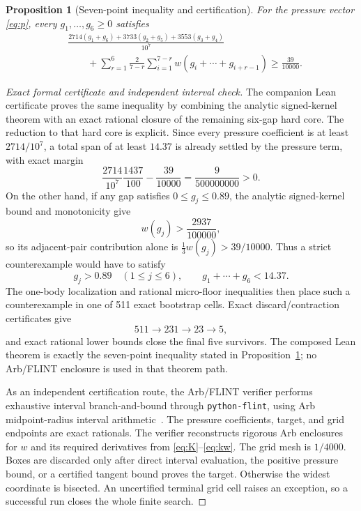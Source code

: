 \documentclass[11pt]{article}
\newtheorem{proposition}[theorem]{Proposition}
\begin{document}
\begin{proposition}[Seven-point inequality and certification]\label{prop:cert}
For the pressure vector \eqref{eq:p}, every $g_1,\ldots,g_6\ge0$ satisfies
\begin{align}
 &\frac{2714(g_1+g_6)+3733(g_2+g_5)+3553(g_3+g_4)}{10^7}\nonumber\\
 &\qquad+
 \sum_{r=1}^6\frac{2}{7-r}
 \sum_{i=1}^{7-r}w(g_i+\cdots+g_{i+r-1})
 \ge\frac{39}{10000}.
 \label{eq:cert}
\end{align}
\end{proposition}

\begin{proof}[Exact formal certificate and independent interval check]
The companion Lean certificate proves the same inequality by combining the
analytic signed-kernel theorem with an exact rational closure of the remaining
six-gap hard core.  The reduction to that hard core is explicit.  Since every
pressure coefficient is at least $2714/10^7$, a total span of at least
$14.37$ is already settled by the pressure term, with exact margin
\[
 \frac{2714}{10^7}\frac{1437}{100}
 -\frac{39}{10000}
 =
 \frac{9}{500000000}>0.
\]
On the other hand, if any gap satisfies $0\le g_j\le0.89$, the analytic
signed-kernel bound and monotonicity give
\[
 w(g_j)>\frac{2937}{100000},
\]
so its adjacent-pair contribution alone is
$\frac13w(g_j)>39/10000$.  Thus a strict counterexample would have to satisfy
\[
 g_j>0.89\quad(1\le j\le6),
 \qquad
 g_1+\cdots+g_6<14.37.
\]
The one-body localization and rational micro-floor inequalities then place
such a counterexample in one of 511 exact bootstrap cells.  Exact
discard/contraction certificates give
\[
 511\longrightarrow231\longrightarrow23\longrightarrow5,
\]
and exact rational lower bounds close the final five survivors.  The composed
Lean theorem is exactly the seven-point inequality stated in
Proposition~\ref{prop:cert}; no Arb/FLINT enclosure is used in that theorem
path.

As an independent certification route, the Arb/FLINT verifier performs
exhaustive interval branch-and-bound through \texttt{python-flint}, using
Arb midpoint-radius interval arithmetic~\cite{Johansson17}.  The
pressure coefficients, target, and grid endpoints are exact rationals.  The
verifier reconstructs rigorous Arb enclosures for $w$ and its required
derivatives from \eqref{eq:K}--\eqref{eq:kw}.  The grid mesh is $1/4000$.
Boxes are discarded only after direct interval evaluation, the positive
pressure bound, or a certified tangent bound proves the target.  Otherwise the
widest coordinate is bisected.  An uncertified terminal grid cell raises an
exception, so a successful run closes the whole finite search.


\end{proof}
\end{document}
